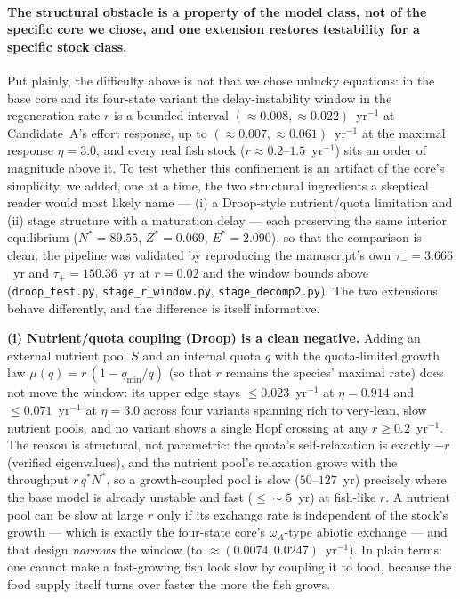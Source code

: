 \documentclass[twocolumn,10pt]{article}
\begin{document}
\paragraph{The structural obstacle is a property of the model class, not of the specific core we chose, and one extension restores testability for a specific stock class.}
Put plainly, the difficulty above is not that we chose unlucky equations: in the base core and its four-state variant the delay-instability window in the regeneration rate $r$ is a bounded interval $(\approx0.008,\approx0.022)$~yr$^{-1}$ at Candidate~A's effort response, up to $(\approx0.007,\approx0.061)$~yr$^{-1}$ at the maximal response $\eta=3.0$, and every real fish stock ($r\approx0.2$--$1.5$~yr$^{-1}$) sits an order of magnitude above it. To test whether this confinement is an artifact of the core's simplicity, we added, one at a time, the two structural ingredients a skeptical reader would most likely name --- (i) a Droop-style nutrient/quota limitation and (ii) stage structure with a maturation delay --- each preserving the same interior equilibrium ($N^*=89.55$, $Z^*=0.069$, $E^*=2.090$), so that the comparison is clean; the pipeline was validated by reproducing the manuscript's own $\tau_-=3.666$~yr and $\tau_+=150.36$~yr at $r=0.02$ and the window bounds above (\texttt{droop\_test.py}, \texttt{stage\_r\_window.py}, \texttt{stage\_decomp2.py}). The two extensions behave differently, and the difference is itself informative.

\textbf{(i) Nutrient/quota coupling (Droop) is a clean negative.} Adding an external nutrient pool $S$ and an internal quota $q$ with the quota-limited growth law $\mu(q)=r\,(1-q_{\min}/q)$ (so that $r$ remains the species' maximal rate) does not move the window: its upper edge stays $\le0.023$~yr$^{-1}$ at $\eta=0.914$ and $\le0.071$~yr$^{-1}$ at $\eta=3.0$ across four variants spanning rich to very-lean, slow nutrient pools, and no variant shows a single Hopf crossing at any $r\ge0.2$~yr$^{-1}$. The reason is structural, not parametric: the quota's self-relaxation is exactly $-r$ (verified eigenvalues), and the nutrient pool's relaxation grows with the throughput $r\,q^* N^*$, so a growth-coupled pool is slow ($50$--$127$~yr) precisely where the base model is already unstable and fast ($\le\sim5$~yr) at fish-like $r$. A nutrient pool can be slow at large $r$ only if its exchange rate is independent of the stock's growth --- which is exactly the four-state core's $\omega_A$-type abiotic exchange --- and that design \emph{narrows} the window (to $\approx(0.0074,0.0247)$~yr$^{-1}$). In plain terms: one cannot make a fast-growing fish look slow by coupling it to food, because the food supply itself turns over faster the more the fish grows.
\end{document}
